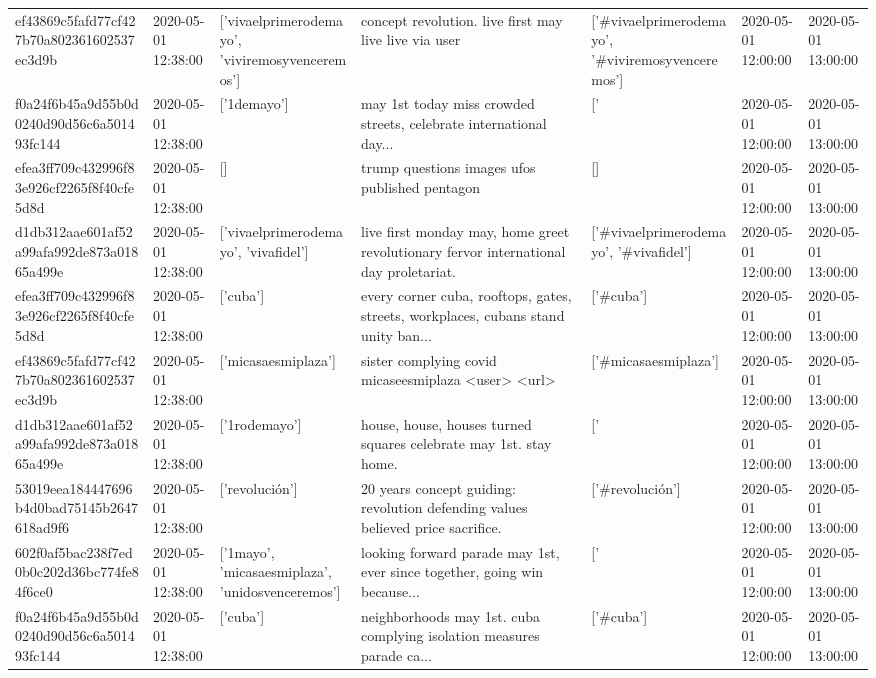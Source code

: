 \begin{tabular}{lllllll}
ef43869c5fafd77cf427b70a802361602537ec3d9b & 2020-05-01 12:38:00 & ['vivaelprimerodemayo', 'viviremosyvenceremos'] & concept revolution. live first may live live via user & ['#vivaelprimerodemayo', '#viviremosyvenceremos'] & 2020-05-01 12:00:00 & 2020-05-01 13:00:00 \\
f0a24f6b45a9d55b0d0240d90d56c6a501493fc144 & 2020-05-01 12:38:00 & ['1demayo'] & may 1st today miss crowded streets, celebrate international day... & ['#1demayo'] & 2020-05-01 12:00:00 & 2020-05-01 13:00:00 \\
efea3ff709c432996f83e926cf2265f8f40cfe5d8d & 2020-05-01 12:38:00 & [] & trump questions images ufos published pentagon & [] & 2020-05-01 12:00:00 & 2020-05-01 13:00:00 \\
d1db312aae601af52a99afa992de873a01865a499e & 2020-05-01 12:38:00 & ['vivaelprimerodemayo', 'vivafidel'] & live first monday may, home greet revolutionary fervor international day proletariat. & ['#vivaelprimerodemayo', '#vivafidel'] & 2020-05-01 12:00:00 & 2020-05-01 13:00:00 \\
efea3ff709c432996f83e926cf2265f8f40cfe5d8d & 2020-05-01 12:38:00 & ['cuba'] & every corner cuba, rooftops, gates, streets, workplaces, cubans stand unity ban... & ['#cuba'] & 2020-05-01 12:00:00 & 2020-05-01 13:00:00 \\
ef43869c5fafd77cf427b70a802361602537ec3d9b & 2020-05-01 12:38:00 & ['micasaesmiplaza'] & sister complying covid micaseesmiplaza <user> <url> & ['#micasaesmiplaza'] & 2020-05-01 12:00:00 & 2020-05-01 13:00:00 \\
d1db312aae601af52a99afa992de873a01865a499e & 2020-05-01 12:38:00 & ['1rodemayo'] & house, house, houses turned squares celebrate may 1st. stay home. & ['#1rodemayo'] & 2020-05-01 12:00:00 & 2020-05-01 13:00:00 \\
53019eea184447696b4d0bad75145b2647618ad9f6 & 2020-05-01 12:38:00 & ['revolución'] & 20 years concept guiding: revolution defending values believed price sacrifice. & ['#revolución'] & 2020-05-01 12:00:00 & 2020-05-01 13:00:00 \\
602f0af5bac238f7ed0b0c202d36bc774fe84f6ce0 & 2020-05-01 12:38:00 & ['1mayo', 'micasaesmiplaza', 'unidosvenceremos'] & looking forward parade may 1st, ever since together, going win because... & ['#1mayo', '#micasaesmiplaza', '#unidosvenceremos'] & 2020-05-01 12:00:00 & 2020-05-01 13:00:00 \\
f0a24f6b45a9d55b0d0240d90d56c6a501493fc144 & 2020-05-01 12:38:00 & ['cuba'] & neighborhoods may 1st. cuba complying isolation measures parade ca... & ['#cuba'] & 2020-05-01 12:00:00 & 2020-05-01 13:00:00 \\

\end{tabular}
